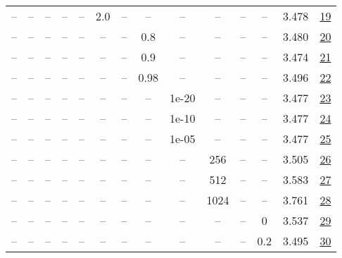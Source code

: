 \begin{table}[H]
\begin{tabular}{cccccccccccccc}
-- & -- & -- & -- & -- & 2.0 & -- & -- & -- & -- & -- & -- & 3.478 & \href{https://wandb.ai/stanford-mercury/optimizer-scaling/runs/sweep-130m-2B-scion304c58lr0.016-wd0.1-minlr0-warmup0-b10.95-gn2-f8f8e8}{19} \\
-- & -- & -- & -- & -- & -- & -- & 0.8 & -- & -- & -- & -- & 3.480 & \href{https://wandb.ai/stanford-mercury/optimizer-scaling/runs/sweep-130m-2B-scion79fee1lr0.016-wd0.1-minlr0-warmup0-b10.95-gn1-b7e1e6}{20} \\
-- & -- & -- & -- & -- & -- & -- & 0.9 & -- & -- & -- & -- & 3.474 & \href{https://wandb.ai/stanford-mercury/optimizer-scaling/runs/sweep-130m-2B-scion5684eclr0.016-wd0.1-minlr0-warmup0-b10.95-gn1-1d55ac}{21} \\
-- & -- & -- & -- & -- & -- & -- & 0.98 & -- & -- & -- & -- & 3.496 & \href{https://wandb.ai/stanford-mercury/optimizer-scaling/runs/sweep-130m-2B-scion52669clr0.016-wd0.1-minlr0-warmup0-b10.95-gn1-0becd6}{22} \\
-- & -- & -- & -- & -- & -- & -- & -- & 1e-20 & -- & -- & -- & 3.477 & \href{https://wandb.ai/stanford-mercury/optimizer-scaling/runs/sweep-130m-2B-scion2b053alr0.016-wd0.1-minlr0-warmup0-b10.95-gn1-9c862f}{23} \\
-- & -- & -- & -- & -- & -- & -- & -- & 1e-10 & -- & -- & -- & 3.477 & \href{https://wandb.ai/stanford-mercury/optimizer-scaling/runs/sweep-130m-2B-scionbd616clr0.016-wd0.1-minlr0-warmup0-b10.95-gn1-ddb0e6}{24} \\
-- & -- & -- & -- & -- & -- & -- & -- & 1e-05 & -- & -- & -- & 3.477 & \href{https://wandb.ai/stanford-mercury/optimizer-scaling/runs/sweep-130m-2B-sciond84c90lr0.016-wd0.1-minlr0-warmup0-b10.95-gn1-3f4d04}{25} \\
-- & -- & -- & -- & -- & -- & -- & -- & -- & 256 & -- & -- & 3.505 & \href{https://wandb.ai/stanford-mercury/optimizer-scaling/runs/sweep-130m-2B-scion5a7263lr0.016-wd0.1-minlr0-warmup0-b10.95-gn1-4dcd4d}{26} \\
-- & -- & -- & -- & -- & -- & -- & -- & -- & 512 & -- & -- & 3.583 & \href{https://wandb.ai/stanford-mercury/optimizer-scaling/runs/sweep-130m-2B-scionb67125lr0.016-wd0.1-minlr0-warmup0-b10.95-gn1-debbed}{27} \\
-- & -- & -- & -- & -- & -- & -- & -- & -- & 1024 & -- & -- & 3.761 & \href{https://wandb.ai/stanford-mercury/optimizer-scaling/runs/sweep-130m-2B-scionb3e82dlr0.016-wd0.1-minlr0-warmup0-b10.95-gn1-8a367e}{28} \\
-- & -- & -- & -- & -- & -- & -- & -- & -- & -- & -- & 0 & 3.537 & \href{https://wandb.ai/stanford-mercury/optimizer-scaling/runs/sweep-130m-2B-scion5931c7lr0.016-wd0-minlr0-warmup0-b10.95-gn1-s-e03372}{29} \\
-- & -- & -- & -- & -- & -- & -- & -- & -- & -- & -- & 0.2 & 3.495 & \href{https://wandb.ai/stanford-mercury/optimizer-scaling/runs/sweep-130m-2B-scion6d1cdflr0.016-wd0.2-minlr0-warmup0-b10.95-gn1-78231c}{30} \\
\bottomrule
\end{tabular}
\end{table}


